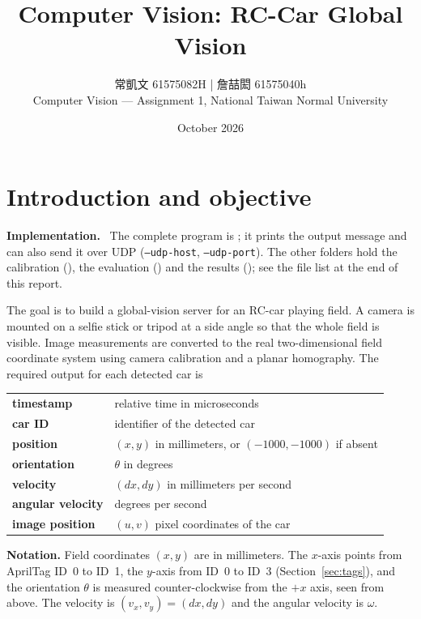 \documentclass[10pt,a4paper]{article}
\title{\vspace{-1.2em}Computer Vision: RC-Car Global Vision\vspace{-0.5em}}
\author{常凱文  61575082H | 詹喆閎 61575040h \\ \small Computer Vision --- Assignment 1, National Taiwan Normal University}
\date{October 2026}
\newenvironment{impl}{\par\smallskip\noindent\footnotesize\textbf{Implementation.}\ }{\par\smallskip}
\begin{document}
\maketitle
\vspace{-1.5em}

\section{Introduction and objective}
\label{sec:intro}

\begin{impl}
The complete program is ; it prints the output
message and can also send it over UDP (\texttt{--udp-host}, \texttt{--udp-port}).
The other folders hold the calibration (), the evaluation
() and the results (); see the file list at the
end of this report.
\end{impl}

The goal is to build a global-vision server for an RC-car playing field.  A
camera is mounted on a selfie stick or tripod at a side angle so that the
whole field is visible.  Image measurements are converted to the real
two-dimensional field coordinate system using camera calibration and a
planar homography.  The required output for each detected car is

\begin{center}
\small
\begin{tabular}{ll}
\textbf{timestamp} & relative time in microseconds\\
\textbf{car ID} & identifier of the detected car\\
\textbf{position} & $(x,y)$ in millimeters, or $(-1000,-1000)$ if absent\\
\textbf{orientation} & $\theta$ in degrees\\
\textbf{velocity} & $(dx,dy)$ in millimeters per second\\
\textbf{angular velocity} & degrees per second\\
\textbf{image position} & $(u,v)$ pixel coordinates of the car\\
\end{tabular}
\end{center}

\textbf{Notation.}  Field coordinates $(x,y)$ are in millimeters.  The
$x$-axis points from AprilTag ID~0 to ID~1, the $y$-axis from ID~0 to ID~3
(Section~\ref{sec:tags}), and the orientation $\theta$ is measured
counter-clockwise from the $+x$ axis, seen from above.  The velocity is
$(v_x,v_y)=(dx,dy)$ and the angular velocity is $\omega$.
\end{document}
